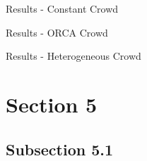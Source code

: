 \documentclass[navbaroff]{sdqbeamer}
\begin{document}
\begin{frame}[label=res_const]{Results - Constant Crowd}
\end{frame}

\begin{frame}{Results - ORCA Crowd}
\end{frame}

\begin{frame}{Results - Heterogeneous Crowd}
\end{frame}

\section{Section 5}
\subsection{Subsection 5.1}
\begin{frame}{}
    \centering
    \textbf{}
\end{frame}
\end{document}
